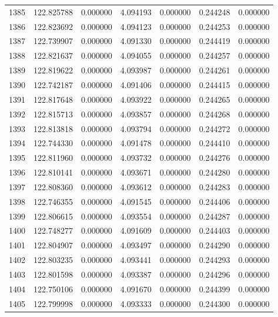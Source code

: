 \begin{tabular}{rrrrrrr}
1385 & 122.825788 &    0.000000 &  4.094193 &    0.000000 &    0.244248 &  0.000000 \\
1386 & 122.823692 &    0.000000 &  4.094123 &    0.000000 &    0.244253 &  0.000000 \\
1387 & 122.739907 &    0.000000 &  4.091330 &    0.000000 &    0.244419 &  0.000000 \\
1388 & 122.821637 &    0.000000 &  4.094055 &    0.000000 &    0.244257 &  0.000000 \\
1389 & 122.819622 &    0.000000 &  4.093987 &    0.000000 &    0.244261 &  0.000000 \\
1390 & 122.742187 &    0.000000 &  4.091406 &    0.000000 &    0.244415 &  0.000000 \\
1391 & 122.817648 &    0.000000 &  4.093922 &    0.000000 &    0.244265 &  0.000000 \\
1392 & 122.815713 &    0.000000 &  4.093857 &    0.000000 &    0.244268 &  0.000000 \\
1393 & 122.813818 &    0.000000 &  4.093794 &    0.000000 &    0.244272 &  0.000000 \\
1394 & 122.744330 &    0.000000 &  4.091478 &    0.000000 &    0.244410 &  0.000000 \\
1395 & 122.811960 &    0.000000 &  4.093732 &    0.000000 &    0.244276 &  0.000000 \\
1396 & 122.810141 &    0.000000 &  4.093671 &    0.000000 &    0.244280 &  0.000000 \\
1397 & 122.808360 &    0.000000 &  4.093612 &    0.000000 &    0.244283 &  0.000000 \\
1398 & 122.746355 &    0.000000 &  4.091545 &    0.000000 &    0.244406 &  0.000000 \\
1399 & 122.806615 &    0.000000 &  4.093554 &    0.000000 &    0.244287 &  0.000000 \\
1400 & 122.748277 &    0.000000 &  4.091609 &    0.000000 &    0.244403 &  0.000000 \\
1401 & 122.804907 &    0.000000 &  4.093497 &    0.000000 &    0.244290 &  0.000000 \\
1402 & 122.803235 &    0.000000 &  4.093441 &    0.000000 &    0.244293 &  0.000000 \\
1403 & 122.801598 &    0.000000 &  4.093387 &    0.000000 &    0.244296 &  0.000000 \\
1404 & 122.750106 &    0.000000 &  4.091670 &    0.000000 &    0.244399 &  0.000000 \\
1405 & 122.799998 &    0.000000 &  4.093333 &    0.000000 &    0.244300 &  0.000000 \\

\end{tabular}
